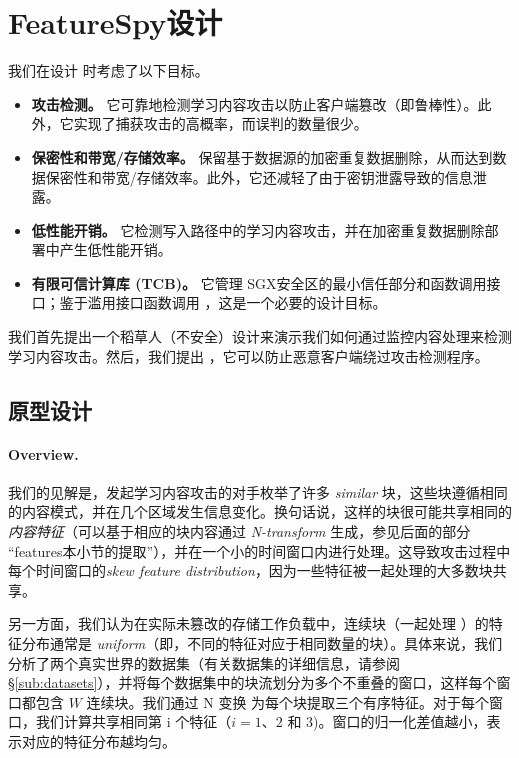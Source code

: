 \section{FeatureSpy设计}
\label{sec:design}
我们在设计 \sysnameF 时考虑了以下目标。

\begin{itemize}[leftmargin=*]
\item {\bf 攻击检测。} 它可靠地检测学习内容攻击以防止客户端篡改（即鲁棒性）。此外，它实现了捕获攻击的高概率，而误判的数量很少。
\item {\bf 保密性和带宽/存储效率。} 保留基于数据源的加密重复数据删除，从而达到数据保密性和带宽/存储效率。此外，它还减轻了由于密钥泄露导致的信息泄露。
\item {\bf 低性能开销。} 它检测写入路径中的学习内容攻击，并在加密重复数据删除部署中产生低性能开销。
\item {\bf 有限可信计算库 (TCB)。} 它管理 SGX安全区的最小信任部分和函数调用接口；鉴于滥用接口函数调用 \cite{lie05}，这是一个必要的设计目标。
\end{itemize}

我们首先提出一个稻草人（不安全）设计来演示我们如何通过监控内容处理来检测学习内容攻击。然后，我们提出 \sysnameF，它可以防止恶意客户端绕过攻击检测程序。


\subsection{原型设计}
\label{sub:basic}
\paragraph{Overview.} 我们的见解是，发起学习内容攻击的对手枚举了许多 {\em similar} 块，这些块遵循相同的内容模式，并在几个区域发生信息变化。换句话说，这样的块很可能共享相同的 {\em 内容特征}（可以基于相应的块内容通过 {\em N-transform} \cite{shilane12} 生成，参见后面的部分 “features本小节的提取”），并在一个小的时间窗口内进行处理。这导致攻击过程中每个时间窗口的{\em skew feature distribution}，因为一些特征被一起处理的大多数块共享。

另一方面，我们认为在实际未篡改的存储工作负载中，连续块（一起处理 \cite{zhu08}）的特征分布通常是 {\em uniform}（即，不同的特征对应于相同数量的块）。具体来说，我们分析了两个真实世界的数据集（有关数据集的详细信息，请参阅 \S\ref{sub:datasets}），并将每个数据集中的块流划分为多个不重叠的窗口，这样每个窗口都包含 $W$ 连续块。我们通过 N 变换 \cite{shilane12} 为每个块提取三个有序特征。对于每个窗口，我们计算共享相同第 i 个特征（$ i=1、2$ 和 $3$)。窗口的归一化差值越小，表示对应的特征分布越均匀。


